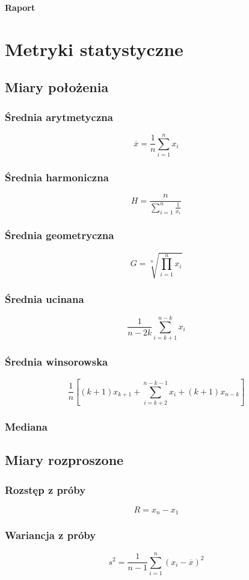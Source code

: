 \documentclass[12pt]{article}
\begin{document}
	\begin{center}
		\begin{LARGE}
			\textbf{Raport}
		\end{LARGE}
	\end{center}
\newpage
\section{Metryki statystyczne}
	\subsection{Miary położenia}
		\subsubsection{Średnia arytmetyczna}
			\[
				\overline{x} = \frac{1}{n} \sum_{i=1}^{n}x_i
			\]
		\subsubsection{Średnia harmoniczna}
			\[
				H = \frac{n}{\sum\limits_{i=1}^{n}\frac{1}{x_i}}
			\]
		\subsubsection{Średnia geometryczna}
			\[
				G = \sqrt[n]{\prod_{i=1}^{n}x_i}
			\]
		\subsubsection{Średnia ucinana}
			\[
				\frac{1}{n-2k}\sum_{i=k+1}^{n-k}x_i
			\]
		\subsubsection{Średnia winsorowska}
			\[
				\frac{1}{n}\left[(k+1)x_{k+1} + \sum_{i=k+2}^{n-k-1}x_i + (k+1)x_{n-k} \right]
			\]
		\subsubsection{Mediana}
	\subsection{Miary rozproszone}
		\subsubsection{Rozstęp z próby}
			\[
				R = x_n - x_1
			\]
		\subsubsection{Wariancja z próby}
			\[
				s^2 = \frac{1}{n-1} \sum_{i=1}^{n}(x_i - \overline{x})^2
			\]
\end{document}
